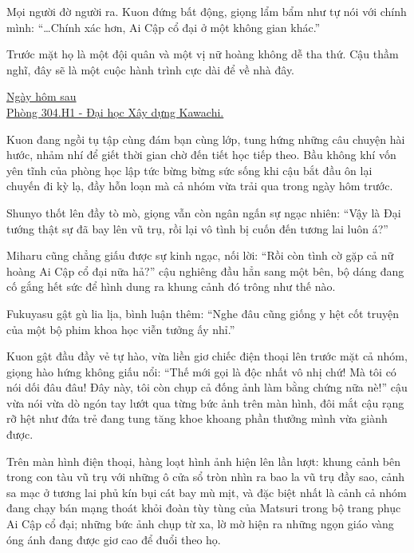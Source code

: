 \documentclass[../main.tex]{subfiles}
\begin{document}
Mọi người đờ người ra. Kuon đứng bất động, giọng lẩm bẩm như tự nói với chính mình: ``\dots Chính xác hơn, Ai Cập cổ đại ở một không gian khác.''

Trước mặt họ là một đội quân và một vị nữ hoàng không dễ tha thứ. Cậu thầm nghĩ, đây sẽ là một cuộc hành trình cực dài để về nhà đây.

\omk

\begin{center}
  \uline{Ngày hôm sau \\ Phòng 304.H1 - Đại học Xây dựng Kawachi.}
\end{center}


Kuon đang ngồi tụ tập cùng đám bạn cùng lớp, tung hứng những câu chuyện hài hước, nhảm nhí để giết thời gian chờ đến tiết học tiếp theo. Bầu không khí vốn yên tĩnh của phòng học lập tức bừng bừng sức sống khi cậu bắt đầu ôn lại chuyến đi kỳ lạ, đầy hỗn loạn mà cả nhóm vừa trải qua trong ngày hôm trước.

Shunyo thốt lên đầy tò mò, giọng vẫn còn ngân ngấn sự ngạc nhiên: ``Vậy là Đại tướng thật sự đã bay lên vũ trụ, rồi lại vô tình bị cuốn đến tương lai luôn á?''

Miharu cũng chẳng giấu được sự kinh ngạc, nối lời: ``Rồi còn tình cờ gặp cả nữ hoàng Ai Cập cổ đại nữa hả?'' cậu nghiêng đầu hẳn sang một bên, bộ dáng đang cố gắng hết sức để hình dung ra khung cảnh đó trông như thế nào.

Fukuyasu gật gù lia lịa, bình luận thêm: ``Nghe đâu cũng giống y hệt cốt truyện của một bộ phim khoa học viễn tưởng ấy nhỉ.''

Kuon gật đầu đầy vẻ tự hào, vừa liền giơ chiếc điện thoại lên trước mặt cả nhóm, giọng hào hứng không giấu nổi: ``Thế mới gọi là độc nhất vô nhị chứ! Mà tôi có nói dối đâu đâu! Đây này, tôi còn chụp cả đống ảnh làm bằng chứng nữa nè!'' cậu vừa nói vừa dò ngón tay lướt qua từng bức ảnh trên màn hình, đôi mắt cậu rạng rỡ hệt như đứa trẻ đang tung tăng khoe khoang phần thưởng mình vừa giành được.

Trên màn hình điện thoại, hàng loạt hình ảnh hiện lên lần lượt: khung cảnh bên trong con tàu vũ trụ với những ô cửa sổ tròn nhìn ra bao la vũ trụ đầy sao, cảnh sa mạc ở tương lai phủ kín bụi cát bay mù mịt, và đặc biệt nhất là cảnh cả nhóm đang chạy bán mạng thoát khỏi đoàn tùy tùng của Matsuri trong bộ trang phục Ai Cập cổ đại; những bức ảnh chụp từ xa, lờ mờ hiện ra những ngọn giáo vàng óng ánh đang được giơ cao để đuổi theo họ.
\end{document}
